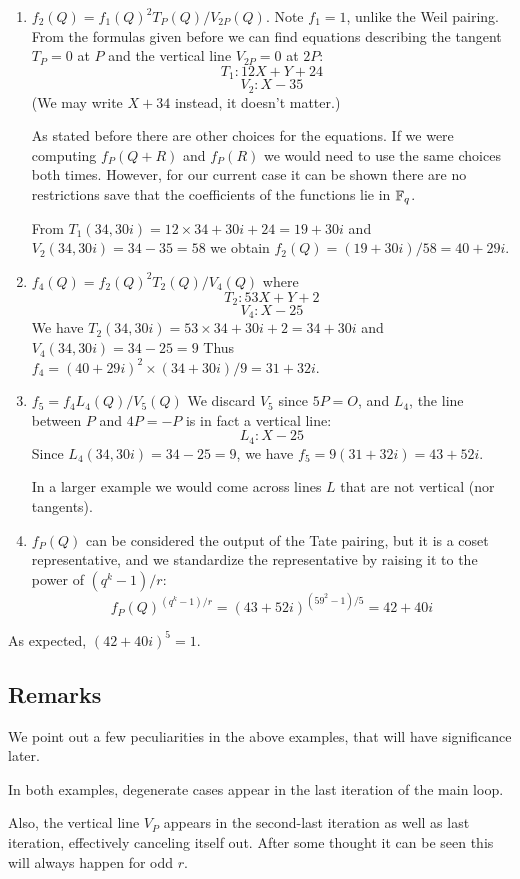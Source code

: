 \begin{enumerate}
\item
$f_2(Q) = f_1(Q)^2 T_P (Q) / V_{2P}(Q)$.
Note $f_1 = 1$, unlike the Weil pairing.
From the formulas given before we can find equations describing
the tangent $T_P = 0$ at $P$ and the vertical line $V_{2P} = 0$ at $2P$:
\[ T_1 : 12 X + Y + 24 \]
\[ V_2 : X - 35 \]
(We may write $X + 34$ instead, it doesn't matter.)

As stated before there are other choices for the equations.
If we were computing $f_P(Q+R)$ and $f_P(R)$ we would need
to use the same choices both times. However, for our current case it
can be shown
there are no restrictions save that the coefficients of the functions
lie in $\mathbb{F}_q$.

From
$T_1(34, 30i) = 12 \times 34 + 30i + 24 = 19 + 30i$ and
$V_2(34, 30i) = 34 - 35 = 58$
we obtain $f_2(Q) = (19 + 30i) / 58 =  40 + 29i$.
\item
$f_4(Q) = f_2(Q) ^2 T_2 (Q) / V_4(Q)$ where
\[ T_2 : 53 X + Y + 2 \]
\[ V_4 : X - 25 \]
We have
$T_2(34,30i) = 53 \times 34 + 30i + 2 = 34 + 30i$ and
$V_4(34,30i) = 34 - 25 = 9$ Thus
$f_4 = (40 + 29i)^2 \times (34+30i) / 9 = 31 + 32i$.
\item
$f_5 = f_4 L_4(Q) / V_5(Q)$
We discard $V_5$ since $5P = O$, and $L_4$, the line between $P$ and $4P = -P$
is in fact a vertical line:
\[ L_4: X - 25 \]
Since
$L_4(34, 30i) = 34 - 25 = 9$, we have
$f_5 = 9(31 + 32i) = 43 + 52i$.

In a larger example we would
come across lines $L$ that are not vertical (nor tangents).
\item
$f_P(Q)$ can be considered the output of the Tate pairing,
but it is a coset representative, and we standardize the representative
by raising it to the power of $(q^k - 1)/r$:
\[ f_P(Q)^{(q^k-1)/r} = (43+52i)^{(59^2 - 1)/5} = 42+40i \]
\end{enumerate}

As expected, $(42 + 40i)^5 = 1$.

\subsection {Remarks}
We point out a few peculiarities in the above examples, that will
have significance later.

In both examples,
degenerate cases appear in the last iteration
of the main loop.

Also, the vertical line $V_P$ appears
in the second-last iteration as well as last iteration, effectively canceling
itself out. After some thought it can be seen this will always happen
for odd $r$.


